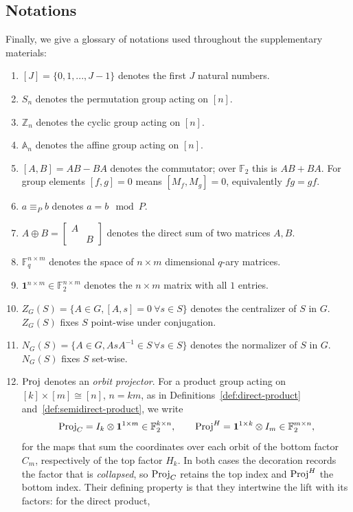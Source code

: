 \subsection{Notations}\label{ssec:notations}
Finally, we give a glossary of notations used throughout the supplementary materials:
\begin{enumerate}
    \item $[J] = \{0,1,...,J-1\}$ denotes the first $J$ natural numbers.
    \item $S_n$ denotes the permutation group acting on $[n]$.
    \item $\mathbb Z_n$ denotes the cyclic group acting on $[n]$.
    \item $\mathbb A_n$ denotes the affine group acting on $[n]$.
    \item $[A, B] = AB-BA$ denotes the commutator; over $\mathbb F_2$ this is $AB+BA$. For group elements $[f,g] = 0$ means $[M_f,M_g] = 0$, equivalently $fg = gf$.
    \item $a \equiv_P b$ denotes $a = b\mod P$.
    \item $A\oplus B = \begin{bmatrix}A&\\&B\end{bmatrix}$ denotes the direct sum of two matrices $A,B$.
    \item $\mathbb F^{n\times m}_q$ denotes the space of $n\times m$ dimensional $q$-ary matrices.
    \item $\textbf{1}^{n\times m} \in \mathbb F_2^{n\times m}$ denotes the $n\times m$ matrix with all $1$ entries.
    \item $Z_G(S) = \{A\in G, [A,s] = 0\ \forall s\in S\}$ denotes the centralizer of $S$ in $G$. $Z_G(S)$ fixes $S$ point-wise under conjugation.
    \item $N_G(S) = \{A\in G, AsA^{-1} \in S\,  \forall s\in S\}$ denotes the normalizer of $S$ in $G$. $N_G(S)$ fixes $S$ set-wise.
    \item $\mathrm{Proj}$ denotes an \emph{orbit projector}. For a product group acting on $[k]\times[m]\cong[n]$, $n = km$, as in Definitions~\ref{def:direct-product} and~\ref{def:semidirect-product}, we write
    \[
        \mathrm{Proj}_C = I_k\otimes \textbf{1}^{1\times m}\in \mathbb F_2^{k\times n},
        \qquad
        \mathrm{Proj}^H = \textbf{1}^{1\times k}\otimes I_m\in \mathbb F_2^{m\times n},
    \]
    for the maps that sum the coordinates over each orbit of the bottom factor $C_m$, respectively of the top factor $H_k$. In both cases the decoration records the factor that is \emph{collapsed}, so $\mathrm{Proj}_C$ retains the top index and $\mathrm{Proj}^H$ the bottom index. Their defining property is that they intertwine the lift with its factors: for the direct product,

\end{enumerate}
